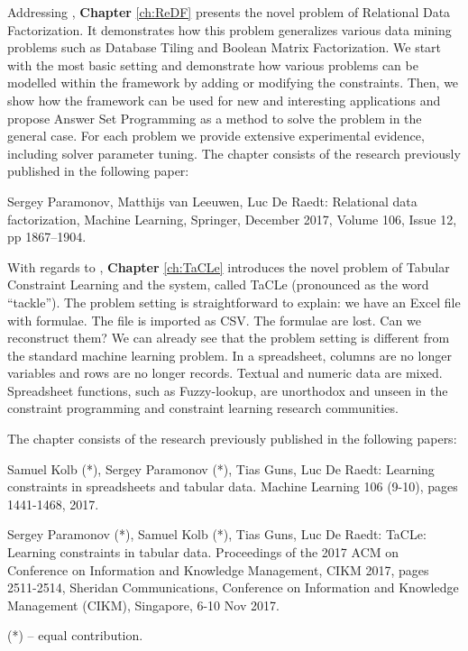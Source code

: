 Addressing \cone, \textbf{Chapter} \ref{ch:ReDF} presents the novel problem of Relational Data
Factorization. It demonstrates how this problem generalizes various
data mining problems such as Database Tiling and Boolean Matrix
Factorization. We start with the most basic setting and demonstrate
how various problems can be modelled within the framework by adding
or modifying the constraints. Then, we show how the framework can be
used for new and interesting applications and propose Answer Set
Programming as a method to solve the problem in the general case.
For each problem we provide extensive experimental evidence,
including solver parameter tuning. The chapter consists of the
research previously published in the following paper:

\begin{addmargin}[2em]{2em}

Sergey Paramonov,  Matthijs van Leeuwen, Luc De Raedt: Relational data
factorization, Machine Learning, Springer, December 2017, Volume 106,
    Issue 12, pp 1867–1904.

\end{addmargin}



With regards to \ctwo,  \textbf{Chapter} \ref{ch:TaCLe} introduces  the novel problem of
Tabular Constraint Learning and the system, called TaCLe (pronounced
as the word ``tackle''). The problem setting is straightforward to
explain: we have an Excel file with formulae. The file is imported as
CSV. The formulae are lost. Can we reconstruct them? We can already 
see that the problem setting is different from the standard machine
learning problem. In a spreadsheet, columns are no longer variables
and rows are no longer records. Textual and numeric data are mixed.
Spreadsheet functions, such as Fuzzy-lookup, are unorthodox and unseen in
the constraint programming and constraint learning research communities.

The chapter consists of the research previously published in the following papers:

\begin{addmargin}[2em]{2em}
Samuel Kolb (*), Sergey Paramonov (*), Tias Guns, Luc De Raedt:
  Learning constraints in spreadsheets and tabular data. Machine
  Learning 106 (9-10), pages 1441-1468, 2017.


Sergey Paramonov (*), Samuel Kolb (*), Tias Guns, Luc De Raedt:
TaCLe: Learning constraints in tabular data. 
 Proceedings of the 2017 ACM on Conference on Information and
    Knowledge Management, CIKM 2017, pages 2511-2514, Sheridan
    Communications, Conference on Information and Knowledge Management
    (CIKM), Singapore, 6-10 Nov 2017.

\pubrev
(*) -- equal contribution.
\pubrevend
\end{addmargin}





